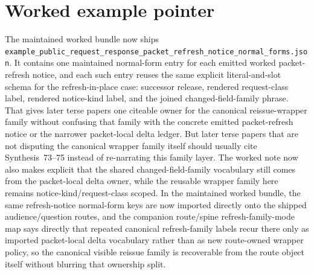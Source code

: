 \documentclass[11pt]{article}
\begin{document}
\section{Worked example pointer}
The maintained worked bundle now ships \nolinkurl{example_public_request_response_packet_refresh_notice_normal_forms.json}.\cite{series:workedexample}
It contains one maintained normal-form entry for each emitted worked packet-refresh notice, and each such entry reuses the same explicit literal-and-slot schema for the refresh-in-place case: successor release, rendered request-class label, rendered notice-kind label, and the joined changed-field-family phrase.
That gives later terse papers one citeable owner for the canonical reissue-wrapper family without confusing that family with the concrete emitted packet-refresh notice or the narrower packet-local delta ledger. But later terse papers that are not disputing the canonical wrapper family itself should usually cite Synthesis~73--75 instead of re-narrating this family layer. The worked note now also makes explicit that the shared changed-field-family vocabulary still comes from the packet-local delta owner, while the reusable wrapper family here remains notice-kind/request-class scoped. In the maintained worked bundle, the same refresh-notice normal-form keys are now imported directly onto the shipped audience/question routes, and the companion route/spine refresh-family-mode map says directly that repeated canonical refresh-family labels recur there only as imported packet-local delta vocabulary rather than as new route-owned wrapper policy, so the canonical visible reissue family is recoverable from the route object itself without blurring that ownership split.
\end{document}
